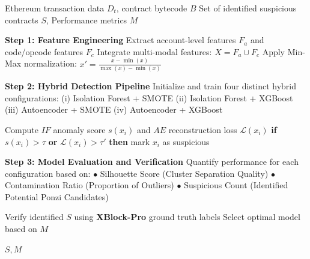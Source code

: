 \documentclass[conference]{IEEEtran}
\begin{document}
\begin{algorithm}[htbp]
\caption{Proposed Hybrid Ponzi Smart Contract Detection Framework}
\label{alg:framework}
\begin{algorithmic}[1]

\Require Ethereum transaction data $D_t$, contract bytecode $B$
\Ensure Set of identified suspicious contracts $S$, Performance metrics $M$

\State \textbf{Step 1: Feature Engineering}
\State Extract account-level features $F_a$ and code/opcode features $F_c$
\State Integrate multi-modal features: $X = F_a \cup F_c$
\State Apply Min-Max normalization: $x' = \frac{x - \min(x)}{\max(x) - \min(x)}$

\State \textbf{Step 2: Hybrid Detection Pipeline}
\State Initialize and train four distinct hybrid configurations:
\Statex \hspace{0.5cm} (i) Isolation Forest + SMOTE
\Statex \hspace{0.5cm} (ii) Isolation Forest + XGBoost
\Statex \hspace{0.5cm} (iii) Autoencoder + SMOTE
\Statex \hspace{0.5cm} (iv) Autoencoder + XGBoost

    \State Compute $IF$ anomaly score $s(x_i)$ and $AE$ reconstruction loss $\mathcal{L}(x_i)$
    \State \textbf{if} $s(x_i) > \tau$ \textbf{or} $\mathcal{L}(x_i) > \tau'$ \textbf{then} mark $x_i$ as suspicious
\EndFor

\State \textbf{Step 3: Model Evaluation and Verification}
\State Quantify performance for each configuration based on:
\Statex \hspace{0.5cm} $\bullet$ Silhouette Score (Cluster Separation Quality)
\Statex \hspace{0.5cm} $\bullet$ Contamination Ratio (Proportion of Outliers)
\Statex \hspace{0.5cm} $\bullet$ Suspicious Count (Identified Potential Ponzi Candidates)

\State Verify identified $S$ using \textbf{XBlock-Pro} ground truth labels
\State Select optimal model based on $M$ 

\State \Return $S, M$

\end{algorithmic}
\end{algorithm}
\end{document}
